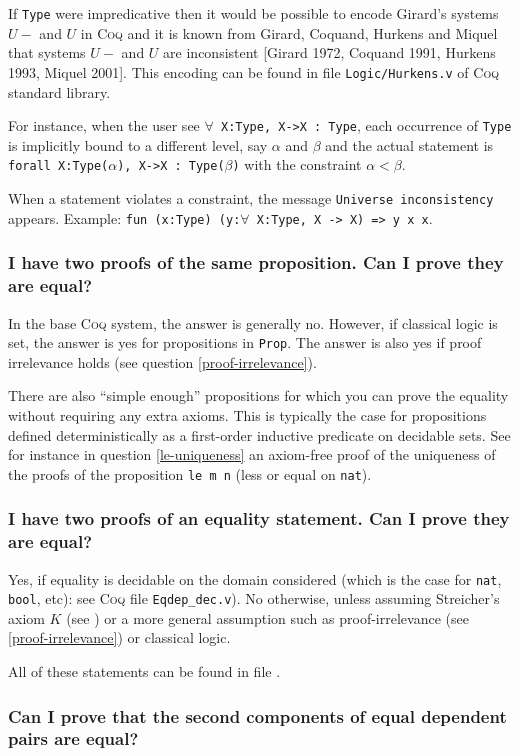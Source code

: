 \documentclass[a4paper,pdftex]{article}
\def\Question#1{\stepcounter{question}\subsubsection{#1}}
\def\Coq{\textsc{Coq}}
\newcommand{\coqimp}{{\mbox{\tt ->}}}
\def\Type{{\tt Type}}
\def\Prop{{\tt Prop}}
\newcommand\vfile[2]{\ahref{#1}{\tt {#2}.v}}
\begin{document}
If {\Type} were impredicative then it would be possible to encode
Girard's systems $U-$ and $U$ in {\Coq} and it is known from Girard,
Coquand, Hurkens and Miquel that systems $U-$ and $U$ are inconsistent
[Girard 1972, Coquand 1991, Hurkens 1993, Miquel 2001]. This encoding
can be found in file {\tt Logic/Hurkens.v} of {\Coq} standard library.

For instance, when the user see {\tt $\forall$ X:Type, X->X : Type}, each
occurrence of {\Type} is implicitly bound to a different level, say
$\alpha$ and $\beta$ and the actual statement is {\tt
forall X:Type($\alpha$), X->X : Type($\beta$)} with the constraint
$\alpha<\beta$.

When a statement violates a constraint, the message {\tt Universe
inconsistency} appears. Example: {\tt fun (x:Type) (y:$\forall$ X:Type, X
{\coqimp} X) => y x x}.

\Question{I have two proofs of the same proposition. Can I prove they are equal?}

In the base {\Coq} system, the answer is generally no. However, if
classical logic is set, the answer is yes for propositions in {\Prop}.
The answer is also yes if proof irrelevance holds (see question
\ref{proof-irrelevance}).

There are also ``simple enough'' propositions for which you can prove
the equality without requiring any extra axioms.  This is typically
the case for propositions defined deterministically as a first-order
inductive predicate on decidable sets. See for instance in question
\ref{le-uniqueness} an axiom-free proof of the uniqueness of the proofs of
the proposition {\tt le m n} (less or equal on {\tt nat}).


\Question{I have two proofs of an equality statement. Can I prove they are 
equal?}

 Yes, if equality is decidable on the domain considered (which
is the case for {\tt nat}, {\tt bool}, etc): see {\Coq} file
\verb=Eqdep_dec.v=). No otherwise, unless
assuming Streicher's axiom $K$ (see \cite{HofStr98}) or a more general
assumption such as proof-irrelevance (see \ref{proof-irrelevance}) or
classical logic.

All of these statements can be found in file \vfile{\LogicEqdep}{Eqdep}.

\Question{Can I prove that the second components of equal dependent
pairs are equal?}
\end{document}
